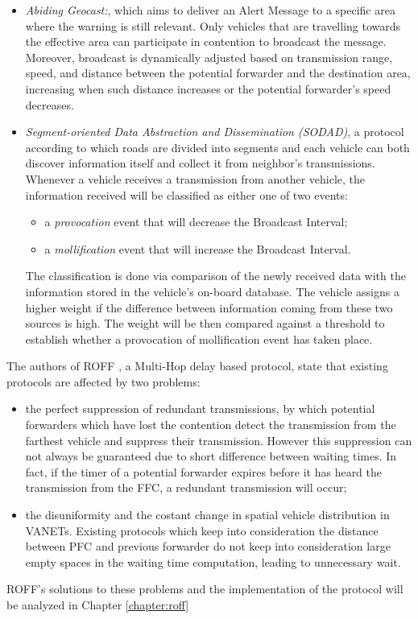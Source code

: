 \begin{enumerate}
\begin{enumerate}
\begin{itemize}
					\item \textit{Abiding Geocast:}\cite{4531929}, which aims to deliver an Alert Message to a specific area where the warning is still relevant. Only vehicles that are travelling towards the effective area can participate in contention to broadcast the message. Moreover, broadcast is dynamically adjusted based on transmission range, speed, and distance between the potential forwarder and the destination area, increasing when such distance increases or the potential forwarder's speed decreases.
					
					\item \textit{Segment-oriented Data Abstraction and Dissemination
						(SODAD)}\cite{1402433}, a protocol according to which roads are divided into segments and each vehicle can both discover information itself and collect it from neighbor's transmissions. Whenever a vehicle receives a transmission from another vehicle, the information received will be classified as either one of two events:
					\begin{itemize}
						\item a \textit{provocation} event that will decrease the Broadcast Interval;
						\item a \textit{mollification} event that will increase the Broadcast Interval.
					\end{itemize}
					The classification is done via comparison of the newly received data with the information stored in the vehicle's on-board database. The vehicle assigns a higher weight if the difference between information coming from these two sources is high. The weight will be then compared against a threshold to establish whether a provocation of mollification event has taken place.
				\end{itemize}
				
				The authors of ROFF \cite{6906275}, a Multi-Hop delay based protocol, state that existing protocols are affected by two problems:
				\begin{itemize}
					\item the perfect suppression of redundant transmissions, by which potential forwarders which have lost the contention detect the transmission from the farthest vehicle and suppress their transmission. However this suppression can not always be guaranteed due to short difference between waiting times. In fact, if the timer of a potential forwarder expires before it has heard the transmission from the FFC, a redundant transmission will occur;
					\item the disuniformity and the costant change in spatial vehicle distribution in VANETs. Existing protocols which keep into consideration the distance between PFC and previous forwarder do not keep into consideration large empty spaces in the waiting time computation, leading to unnecessary wait.
				\end{itemize}
				ROFF's solutions to these problems and the implementation of the protocol will be analyzed in Chapter \ref{chapter:roff}


\end{enumerate}
\end{enumerate}
